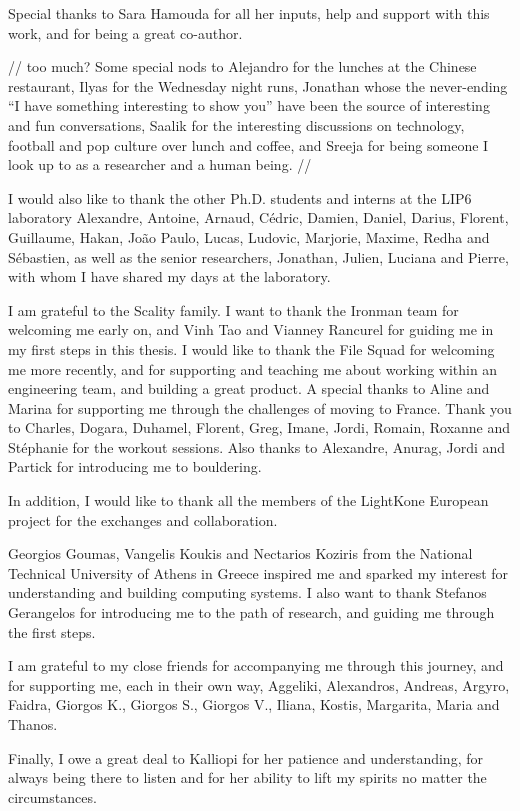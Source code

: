 Special thanks to Sara Hamouda for all her inputs, help and support with this work, and for being a great co-author.

// too much?
Some special nods to
Alejandro for the lunches at the Chinese restaurant,
Ilyas for the Wednesday night runs,
Jonathan whose the never-ending ``I have something interesting to show you'' have been the source of interesting and fun conversations,
Saalik for the interesting discussions on technology, football and pop culture over lunch and coffee,
and Sreeja for being someone I look up to as a researcher and a human being.
//

I would also like to thank the other Ph.D. students and interns at the LIP6 laboratory
Alexandre, Antoine, Arnaud, C\'edric, Damien, Daniel, Darius, Florent, Guillaume, Hakan, Jo\~ao Paulo, Lucas, Ludovic, Marjorie, Maxime, Redha and S\'ebastien,
as well as the senior researchers, Jonathan, Julien, Luciana and Pierre, with whom I have shared my days at the laboratory.

I am grateful to the Scality family. I want to thank the Ironman team for welcoming me early on, and Vinh Tao and
Vianney Rancurel for guiding me in my first steps in this thesis.
I would like to thank the File Squad for welcoming me more recently, and for supporting and teaching me about working within
an engineering team, and building a great product.
A special thanks to Aline and Marina for supporting me through the challenges of moving to France.
Thank you to Charles, Dogara, Duhamel, Florent, Greg, Imane, Jordi, Romain, Roxanne and St\'ephanie for the workout
sessions.
Also thanks to Alexandre, Anurag, Jordi and Partick for introducing me to bouldering.

In addition, I would like to thank all the members of the LightKone European project for the exchanges and collaboration.

\bigskip
Georgios Goumas, Vangelis Koukis and Nectarios Koziris from the National Technical University of Athens in Greece inspired
me and sparked my interest for understanding and building computing systems.
I also want to thank Stefanos Gerangelos for introducing me to the path of research, and guiding me through the first steps.

\bigskip
I am grateful to my close friends for accompanying me through this journey, and for supporting me,
each in their own way,
Aggeliki, Alexandros, Andreas, Argyro, Faidra, Giorgos K., Giorgos S., Giorgos V., Iliana, Kostis, Margarita, Maria and Thanos.

Finally, I owe a great deal to Kalliopi for her patience and understanding, for always being there to listen and for
her ability to lift my spirits no matter the circumstances.
